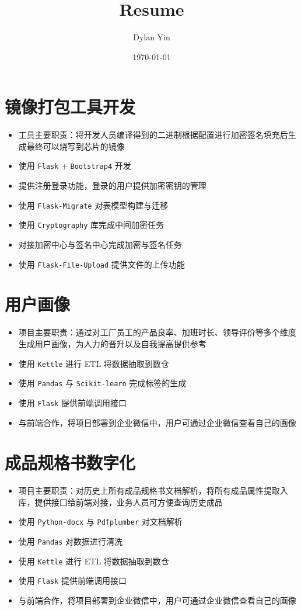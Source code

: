 \documentclass[11pt]{article}
\author{Dylan Yin}
\date{\today}
\title{Resume}
\begin{document}
\maketitle
\tableofcontents

\section{镜像打包工具开发}
\label{sec:orgd305f7b}
\begin{itemize}
\item 工具主要职责：将开发人员编译得到的二进制根据配置进行加密签名填充后生成最终可以烧写到芯片的镜像
\item 使用 \texttt{Flask} + \texttt{Bootstrap4} 开发
\item 提供注册登录功能，登录的用户提供加密密钥的管理
\item 使用 \texttt{Flask-Migrate} 对表模型构建与迁移
\item 使用 \texttt{Cryptography} 库完成中间加密任务
\item 对接加密中心与签名中心完成加密与签名任务
\item 使用 \texttt{Flask-File-Upload} 提供文件的上传功能
\end{itemize}
\section{用户画像}
\label{sec:orge5986d0}
\begin{itemize}
\item 项目主要职责：通过对工厂员工的产品良率、加班时长、领导评价等多个维度生成用户画像，为人力的晋升以及自我提高提供参考
\item 使用 \texttt{Kettle} 进行 ETL 将数据抽取到数仓
\item 使用 \texttt{Pandas} 与 \texttt{Scikit-learn} 完成标签的生成
\item 使用 \texttt{Flask} 提供前端调用接口
\item 与前端合作，将项目部署到企业微信中，用户可通过企业微信查看自己的画像
\end{itemize}
\section{成品规格书数字化}
\label{sec:org987cd15}
\begin{itemize}
\item 项目主要职责：对历史上所有成品规格书文档解析，将所有成品属性提取入库，提供接口给前端对接，业务人员可方便查询历史成品
\item 使用 \texttt{Python-docx} 与 \texttt{Pdfplumber} 对文档解析
\item 使用 \texttt{Pandas} 对数据进行清洗
\item 使用 \texttt{Kettle} 进行 ETL 将数据抽取到数仓
\item 使用 \texttt{Flask} 提供前端调用接口
\item 与前端合作，将项目部署到企业微信中，用户可通过企业微信查看自己的画像
\end{itemize}
\end{document}
